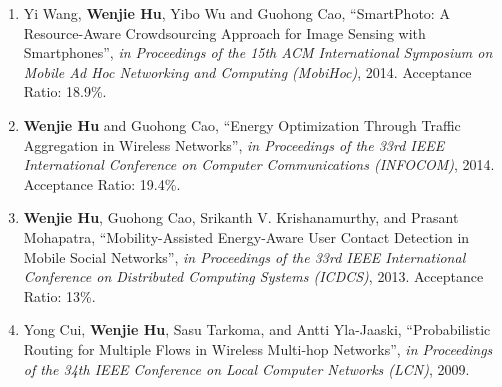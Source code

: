 \documentclass[margin,line]{res}
\begin{document}
\begin{resume}
\begin{enumerate} [leftmargin=5mm]
\item Yi Wang, {\bf Wenjie Hu}, Yibo Wu and Guohong Cao, ``SmartPhoto: A Resource-Aware Crowdsourcing Approach for Image Sensing with Smartphones'', {\em in Proceedings of the 15th ACM International Symposium on Mobile Ad Hoc Networking and Computing (MobiHoc)}, 2014. Acceptance Ratio: 18.9\%.%
\item {\bf Wenjie Hu} and Guohong Cao, ``Energy Optimization Through Traffic Aggregation in Wireless Networks'', {\em in Proceedings of the 33rd IEEE International Conference on Computer Communications (INFOCOM)}, 2014. Acceptance Ratio: 19.4\%.%
\item {\bf Wenjie Hu}, Guohong Cao, Srikanth V. Krishanamurthy, and Prasant Mohapatra, ``Mobility-Assisted Energy-Aware User Contact Detection in Mobile Social Networks'', {\em in Proceedings of the 33rd IEEE International Conference on Distributed Computing Systems (ICDCS)}, 2013. Acceptance Ratio: 13\%.%
\item Yong Cui, {\bf Wenjie Hu}, Sasu Tarkoma, and Antti Yla-Jaaski, ``Probabilistic Routing for Multiple Flows in Wireless Multi-hop Networks'', {\em in Proceedings of the 34th IEEE Conference on Local Computer Networks (LCN)}, 2009. %
\end{enumerate}


\end{resume}
\end{document}
